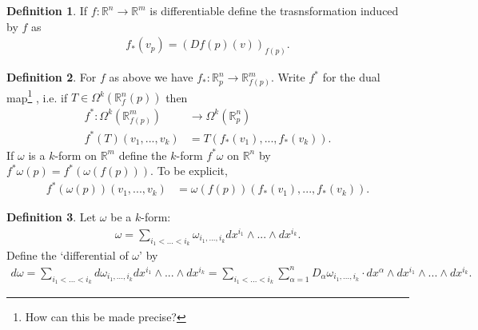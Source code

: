 \documentclass[20pt]{article}
\theoremstyle{plain}
\newtheorem{theorem}{Theorem}
\theoremstyle{definition}
\newtheorem{definition}{Definition}
\newcommand{\reals}{\mathbb{R}}
\begin{document}
  \begin{definition}
    If $f: \reals^n \to \reals^m$ is differentiable define the trasnsformation induced by $f$ as
    \begin{align*}
      f_*(v_p) = (Df(p)(v))_{f(p)}.
    \end{align*}
  \end{definition}

  \begin{definition}
    For $f$ as above we have $f_* : \reals^n_p \to \reals^m_{f(p)}$. 
    Write $f^*$ for the dual map\footnote{How can this be made precise?}
    , i.e. if $T \in \Omega^k(\reals^n_f(p))$ then
    \begin{align*}
      f^* : \Omega^k(\reals^m_{f(p)}) &\to \Omega^k(\reals^n_p)\\
      f^*(T)(v_1, ..., v_k) &= T(f_*(v_1), ..., f_*(v_k)).
    \end{align*}
    If $\omega$ is a $k$-form on $\reals^m$ define the $k$-form $f^*\omega$ on $\reals^n$ by $f^*\omega(p) = f^*(\omega(f(p))).$
    To be explicit, 
    \begin{align*}
     f^*(\omega(p))(v_1, ..., v_k) &= \omega(f(p))(f_*(v_1), ..., f_*(v_k)).      
    \end{align*} 
  \end{definition}




  \begin{definition}
    Let $\omega$ be a $k$-form:
    \begin{align*}
      \omega = \sum_{i_1 < ... < i_k} \omega_{i_1,...,i_k}dx^{i_1} \wedge ... \wedge dx^{i_k}.
    \end{align*}
    Define the `differential of $\omega$' by 
    \begin{align*}
      d\omega = 
      \sum_{i_1 < ... < i_k} d\omega_{i_1,...,i_k}dx^{i_1} \wedge ... \wedge dx^{i_k} = 
      \sum_{i_1 < ... < i_k} \sum_{\alpha = 1}^n D_\alpha \omega_{i_1,...,i_k}  \cdot dx^\alpha \wedge dx^{i_1}\wedge ... \wedge dx^{i_k}.
    \end{align*}
  \end{definition}
\end{document}
